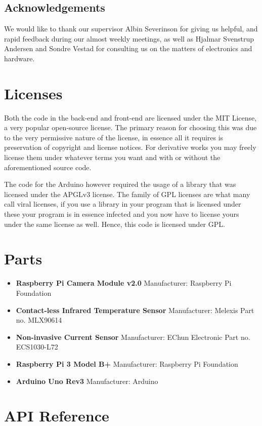 \documentclass[12pt,a4paper,oneside,article]{memoir}
\numberwithin{equation}{chapter}
\begin{document}
\section{Acknowledgements}\label{sec:acknowledgements}
We would like to thank our supervisor Albin Severinson for giving us helpful, 
and rapid feedback during our almost weekly meetings, as well as Hjalmar 
Svenstrup Andersen and Sondre Vestad for consulting us on the matters of 
electronics and hardware.

\clearpage
\appendix
\chapter{Licenses}\label{sec:licenses}
Both the code in the back-end and front-end are licensed under the MIT License,
a very popular open-source license. The primary reason for choosing this was due
to the very permissive nature of the license, in essence all it requires is
preservation of copyright and license notices. For derivative works you may
freely license them under whatever terms you want and with or without the
aforementioned source code.

The code for the Arduino however required the usage of a library that was
licensed under the APGLv3 license. The family of GPL licenses are what many call
viral licenses, if you use a library in your program that is licensed under
these your program is in essence infected and you now have to license yours
under the same license as well. Hence, this code is licensed under GPL.

\chapter{Parts}\label{sec:parts}
\begin{itemize}
\item \textbf{Raspberry Pi Camera Module v2.0} \newline
Manufacturer: Raspberry Pi Foundation

\item \textbf{Contact-less Infrared Temperature Sensor} \newline
Manufacturer: Melexis \newline
Part no. MLX90614

\item \textbf{Non-invasive Current Sensor} \newline
Manufacturer: EChun Electronic \newline
Part no. ECS1030-L72

\item \textbf{Raspberry Pi 3 Model B+} \newline
Manufacturer: Raspberry Pi Foundation 

\item \textbf{Arduino Uno Rev3} \newline
Manufacturer: Arduino

\end{itemize}

\chapter{API Reference}\label{sec:api-reference}

\clearpage{}
\renewcommand*{\UrlFont}{\footnotesize\ttfamily}
\printbibliography{}
\end{document}
